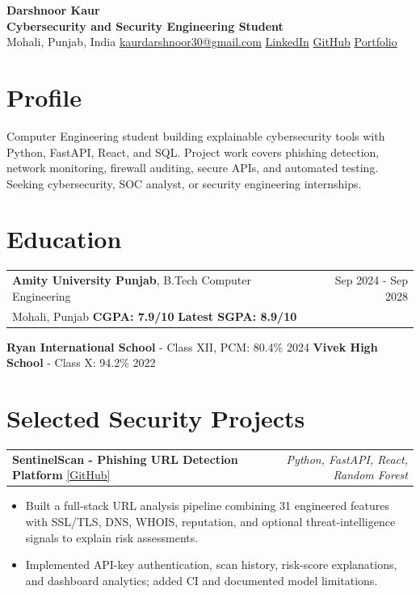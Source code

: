 \documentclass[10pt,letterpaper]{article}
\makeatletter
\newenvironment{resumeitems}{
  \begin{itemize}[
    leftmargin=13pt,
    label=\textbullet,
    itemsep=0.5pt,
    parsep=0pt,
    topsep=1.5pt,
    partopsep=0pt
  ]
}{
  \end{itemize}
}
\newcommand{\projectheading}[3]{%
  \begin{tabularx}{\linewidth}{@{}>{\raggedright\arraybackslash}X@{\hspace{8pt}}r@{}}
    \textbf{#1} \href{#2}{\textcolor{linkblue}{[GitHub]}} &
    \textit{\color{muted}#3}
  \end{tabularx}\par\vspace{1pt}
}
\makeatother
\begin{document}
\begin{center}
  {\fontsize{23}{25}\selectfont\bfseries\color{navy} Darshnoor Kaur}\\[-1pt]
  {\large\bfseries Cybersecurity and Security Engineering Student}\\[2.5pt]
  {\small
    Mohali, Punjab, India
    \enspace\textbar\enspace
    \href{mailto:kaurdarshnoor30@gmail.com}{kaurdarshnoor30@gmail.com}
    \enspace\textbar\enspace
    \href{https://www.linkedin.com/in/darshnoor-kaur-46aab0308}{LinkedIn}
    \enspace\textbar\enspace
    \href{https://github.com/darshnoor30}{GitHub}
    \enspace\textbar\enspace
    \href{https://darshnoor30.github.io/}{Portfolio}
  }
\end{center}
\vspace{-5pt}

\section{Profile}
\small
Computer Engineering student building explainable cybersecurity tools with Python, FastAPI, React, and SQL. Project work covers phishing detection, network monitoring, firewall auditing, secure APIs, and automated testing. Seeking cybersecurity, SOC analyst, or security engineering internships.

\section{Education}
\begin{tabularx}{\linewidth}{@{}Xr@{}}
  \textbf{Amity University Punjab}, B.Tech Computer Engineering & Sep 2024 - Sep 2028\\
  Mohali, Punjab \textbar{} \textbf{CGPA: 7.9/10} \textbar{} \textbf{Latest SGPA: 8.9/10} &
\end{tabularx}
\vspace{1pt}

\textbf{Ryan International School} - Class XII, PCM: 80.4\% \hfill 2024\quad
\textbar\quad \textbf{Vivek High School} - Class X: 94.2\% \hfill 2022

\section{Selected Security Projects}
\projectheading
  {SentinelScan - Phishing URL Detection Platform}
  {https://github.com/darshnoor30/SentinelScan}
  {Python, FastAPI, React, Random Forest}
\begin{resumeitems}
  \item Built a full-stack URL analysis pipeline combining 31 engineered features with SSL/TLS, DNS, WHOIS, reputation, and optional threat-intelligence signals to explain risk assessments.
  \item Implemented API-key authentication, scan history, risk-score explanations, and dashboard analytics; added CI and documented model limitations.
\end{resumeitems}
\end{document}
